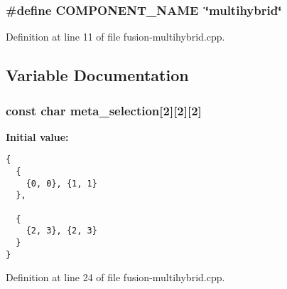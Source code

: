 \subsubsection[{COMPONENT\_\-NAME}]{\setlength{\rightskip}{0pt plus 5cm}\#define COMPONENT\_\-NAME~\char`\"{}multihybrid\char`\"{}}\label{fusion-multihybrid_8cpp_9146ade7ce24e3db226a973a59063892}




Definition at line 11 of file fusion-multihybrid.cpp.

\subsection{Variable Documentation}
\subsubsection[{meta\_\-selection}]{\setlength{\rightskip}{0pt plus 5cm}const char {\bf meta\_\-selection}[2][2][2]\hspace{0.3cm}{\tt  [static]}}\label{fusion-multihybrid_8cpp_bcacb798d9175dec60399d8c948d5b45}


\textbf{Initial value:}

\begin{Code}\begin{verbatim}
{
  {
    {0, 0}, {1, 1}
  },
  
  {
    {2, 3}, {2, 3}
  }
}
\end{verbatim}
\end{Code}


Definition at line 24 of file fusion-multihybrid.cpp.
